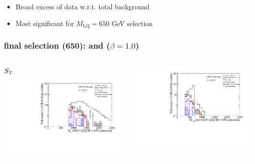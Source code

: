 \documentclass[bigger]{beamer}
\begin{document}
\begin{frame}
\begin{itemize}
\item Broad excess of data w.r.t. total background
\item Most significant for $M_{\text{LQ}} = 650$ GeV selection
\end{itemize}
\end{frame}
\begin{frame}
\frametitle{\eejj final selection (650): \ST and \mejmin ($\beta = 1.0$)}
\label{sec-2-4-2}
\begin{columns}
\begin{column}{0.6\textwidth}
\label{sec-2-4-2-1}

\centering
$S_{\text{T}}$
\includegraphics[width=\textwidth]{fig/ee/finalSelection/sT_eejj_LQ650_eejj.pdf}
\end{column}
\begin{column}{0.6\textwidth}
\label{sec-2-4-2-2}

\centering
\mejmin
\includegraphics[width=\textwidth]{fig/ee/finalSelection/Mej_selected_min_LQ650_eejj.pdf}
\end{column}
\end{columns}
\end{frame}
\end{document}
